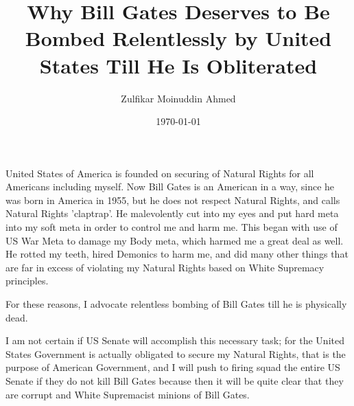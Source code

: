 \documentclass{amsart}
\title{Why Bill Gates Deserves to Be Bombed Relentlessly by United States Till He Is Obliterated}
\author{Zulfikar Moinuddin Ahmed}
\date{\today}
\begin{document}
\maketitle

United States of America is founded on securing of Natural Rights for all Americans including myself.  Now Bill Gates is an American in a way, since he was born in America in 1955, but he does not respect Natural Rights, and calls Natural Rights 'claptrap'. He malevolently cut into my eyes and put hard meta into my soft meta in order to control me and harm me.  This began with use of US War Meta to damage my Body meta, which harmed me a great deal as well. He rotted my teeth, hired Demonics to harm me, and did many other things that are far in excess of violating my Natural Rights based on White Supremacy principles.  

For these reasons, I advocate relentless bombing of Bill Gates till he is physically dead.  

I am not certain if US Senate will accomplish this necessary task; for the United States Government is actually obligated to secure my Natural Rights, that is the purpose of American Government, and I will push to firing squad the entire US Senate if they do not kill Bill Gates because then it will be quite clear that they are corrupt and White Supremacist minions of Bill Gates.
\end{document}
